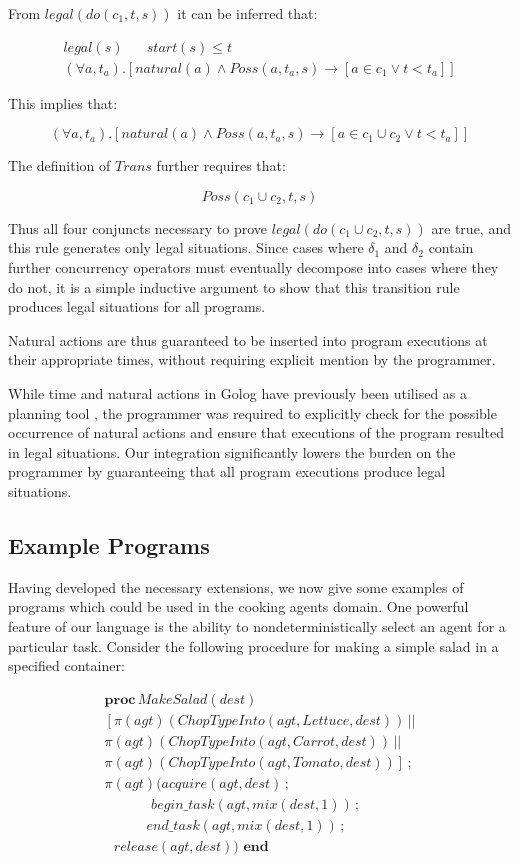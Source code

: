 \documentclass{llncs}
\begin{document}
From $legal(do(c_{1},t,s))$ it can be inferred that:

\[
\begin{array}{c}
legal(s)\,\,\,\,\,\,\,\,\,\, start(s)\leq t\\
(\forall a,t_{a}).\left[natural(a)\wedge Poss(a,t_{a},s)\rightarrow\left[a\in c_{1}\vee t<t_{a}\right]\right]\end{array}\]


This implies that:

\[
(\forall a,t_{a}).\left[natural(a)\wedge Poss(a,t_{a},s)\rightarrow\left[a\in c_{1}\cup c_{2}\vee t<t_{a}\right]\right]\]


The definition of $Trans$ further requires that:

\[
Poss(c_{1}\cup c_{2},t,s)\]


Thus all four conjuncts necessary to prove $legal(do(c_{1}\cup c_{2},t,s))$
are true, and this rule generates only legal situations. Since cases
where $\delta_{1}$ and $\delta_{2}$ contain further concurrency
operators must eventually decompose into cases where they do not,
it is a simple inductive argument to show that this transition rule
produces legal situations for all programs.

Natural actions are thus guaranteed to be inserted into program executions
at their appropriate times, without requiring explicit mention by
the programmer.

While time and natural actions in Golog have previously been utilised
as a planning tool \cite{pirri00planning_nat_acts}, the programmer
was required to explicitly check for the possible occurrence of natural
actions and ensure that executions of the program resulted in legal
situations. Our integration significantly lowers the burden on the
programmer by guaranteeing that all program executions produce legal
situations.


\subsection{Example Programs}

Having developed the necessary extensions, we now give some examples
of programs which could be used in the cooking agents domain. One
powerful feature of our language is the ability to nondeterministically
select an agent for a particular task. Consider the following procedure
for making a simple salad in a specified container:

\[
\begin{array}{c}
\mathbf{proc}\, MakeSalad(dest)\\
\left[\pi(agt)(ChopTypeInto(agt,Lettuce,dest))\,||\right.\\
\pi(agt)(ChopTypeInto(agt,Carrot,dest))\,||\\
\left.\pi(agt)(ChopTypeInto(agt,Tomato,dest))\right]\,;\\
\pi(agt)(acquire(agt,dest)\,;\\
\,\,\,\,\,\,\,\,\,\,\,\,\,\,\,\,\,\,\,\, begin\_ task(agt,mix(dest,1))\,;\\
\,\,\,\,\,\,\,\,\,\,\,\,\,\,\,\,\,\, end\_ task(agt,mix(dest,1))\,;\\
\,\,\,\, release(agt,dest))\,\,\mathbf{end}\end{array}\]
\end{document}
